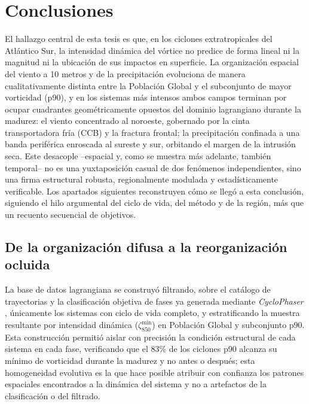 \chapter{Conclusiones}\label{ch:conclusiones}


El hallazgo central de esta tesis es que, en los ciclones extratropicales del Atlántico Sur, la intensidad dinámica del vórtice no predice de forma lineal ni la magnitud ni la ubicación de sus impactos en superficie. La organización espacial del viento a 10 metros y de la precipitación evoluciona de manera cualitativamente distinta entre la Población Global y el subconjunto de mayor vorticidad (p90), y en los sistemas más intensos ambos campos terminan por ocupar cuadrantes geométricamente opuestos del dominio lagrangiano durante la madurez: el viento concentrado al noroeste, gobernado por la cinta transportadora fría (CCB) y la fractura frontal; la precipitación confinada a una banda periférica enroscada al sureste y sur, orbitando el margen de la intrusión seca. Este desacople --espacial y, como se muestra más adelante, también temporal-- no es una yuxtaposición casual de dos fenómenos independientes, sino una firma estructural robusta, regionalmente modulada y estadísticamente verificable. Los apartados siguientes reconstruyen cómo se llegó a esta conclusión, siguiendo el hilo argumental del ciclo de vida, del método y de la región, más que un recuento secuencial de objetivos.

\section{De la organización difusa a la reorganización ocluida}

La base de datos lagrangiana se construyó filtrando, sobre el catálogo de trayectorias y la clasificación objetiva de fases ya generada mediante \textit{CycloPhaser} \citep{coutodesouza2024new, deSouza2025CycloPhaser}, únicamente los sistemas con ciclo de vida completo, y estratificando la muestra resultante por intensidad dinámica ($\zeta_{850}^{\min}$) en Población Global y subconjunto p90. Esta construcción permitió aislar con precisión la condición estructural de cada sistema en cada fase, verificando que el 83\% de los ciclones p90 alcanza su mínimo de vorticidad durante la madurez y no antes o después; esta homogeneidad evolutiva es la que hace posible atribuir con confianza los patrones espaciales encontrados a la dinámica del sistema y no a artefactos de la clasificación o del filtrado.

